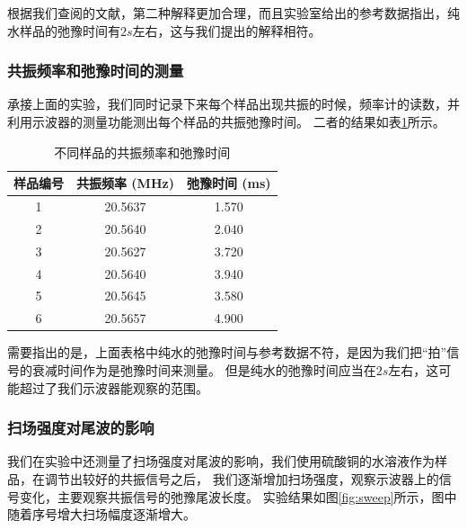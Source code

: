 \documentclass[12pt,a4paper,UTF8]{ctexart}
\begin{document}
根据我们查阅的文献，第二种解释更加合理，而且实验室给出的参考数据指出，纯水样品的弛豫时间有$2s$左右，这与我们提出的解释相符。

\clearpage
\subsubsection*{共振频率和弛豫时间的测量}
承接上面的实验，我们同时记录下来每个样品出现共振的时候，频率计的读数，并利用示波器的测量功能测出每个样品的共振弛豫时间。
二者的结果如表\ref{tab:resonance}所示。

\begin{table}[h!]
    \centering
    \begin{tabular}{|c|c|c|}
        \hline
        样品编号 & 共振频率 (MHz) & 弛豫时间 (ms) \\
        \hline\hline
        1 & 20.5637 & 1.570 \\
        2 & 20.5640 & 2.040 \\
        3 & 20.5627 & 3.720 \\
        4 & 20.5640 & 3.940 \\
        5 & 20.5645 & 3.580 \\
        6 & 20.5657 & 4.900 \\
        \hline
    \end{tabular}
    \caption{不同样品的共振频率和弛豫时间}
    \label{tab:resonance}
\end{table}

需要指出的是，上面表格中纯水的弛豫时间与参考数据不符，是因为我们把“拍”信号的衰减时间作为是弛豫时间来测量。
但是纯水的弛豫时间应当在$2s$左右，这可能超过了我们示波器能观察的范围。

\subsubsection*{扫场强度对尾波的影响}
我们在实验中还测量了扫场强度对尾波的影响，我们使用硫酸铜的水溶液作为样品，在调节出较好的共振信号之后，
我们逐渐增加扫场强度，观察示波器上的信号变化，主要观察共振信号的弛豫尾波长度。
实验结果如图\ref{fig:sweep}所示，图中随着序号增大扫场幅度逐渐增大。
\end{document}
